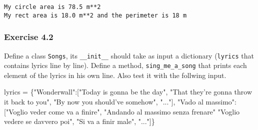 \documentclass[11pt]{article}
\newenvironment{Shaded}{}{}
\newcommand{\StringTok}[1]{\textcolor[rgb]{0.25,0.44,0.63}{{#1}}}
\newcommand{\NormalTok}[1]{{#1}}
\newcommand{\OperatorTok}[1]{\textcolor[rgb]{0.40,0.40,0.40}{{#1}}}
\begin{document}
    \begin{Verbatim}[commandchars=\\\{\}]
My circle area is 78.5 m**2
My rect area is 18.0 m**2 and the perimeter is 18 m

    \end{Verbatim}

    \hypertarget{exercise-4.2}{%
\subsubsection{Exercise 4.2}\label{exercise-4.2}}

Define a class \texttt{Songs}, its \texttt{\_\_init\_\_} should take as
input a dictionary (\texttt{lyrics} that contains lyrics line by line).
Define a method, \texttt{sing\_me\_a\_song} that prints each element of
the lyrics in his own line. Also test it with the follwing input.

\begin{Shaded}
\begin{Highlighting}[]
\NormalTok{lyrics }\OperatorTok{=}\NormalTok{ \{}\StringTok{"Wonderwall"}\NormalTok{:[}\StringTok{"Today is gonna be the day"}\NormalTok{,}
                        \StringTok{"That they're gonna throw it back to you"}\NormalTok{,}
                        \StringTok{"By now you should've somehow"}\NormalTok{, }\StringTok{"..."}\NormalTok{], }
          \StringTok{"Vado al massimo"}\NormalTok{:  [}\StringTok{"Voglio veder come va a finire"}\NormalTok{,}
                        \StringTok{"Andando al massimo senza frenare"}
                        \StringTok{"Voglio vedere se davvero poi"}\NormalTok{,}
                        \StringTok{"Si va a finir male"}\NormalTok{, }\StringTok{"..."}\NormalTok{]\}}
\end{Highlighting}
\end{Shaded}
\end{document}
